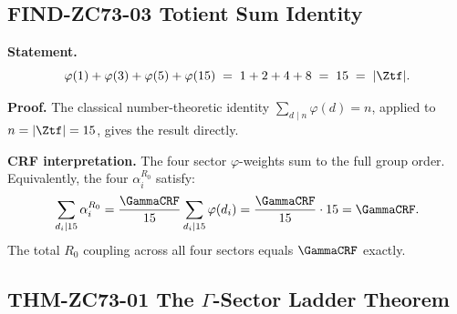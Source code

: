 \documentclass[12pt, a4paper]{article}
\begin{document}
\subsection{FIND-ZC73-03 \quad Totient Sum Identity}
\label{sec:find03}

\begin{derivedbox}[title={FIND-ZC73-03: $\sum_{d_i \mid 15}
  \varphi(d_i) = |\Ztf|$ ($R_0$, Exact)}]
\textbf{Statement.}
\[
  \varphi(1) + \varphi(3) + \varphi(5) + \varphi(15)
  \;=\; 1 + 2 + 4 + 8 \;=\; 15 \;=\; |\Ztf|.
\]

\textbf{Proof.}
The classical number-theoretic identity $\sum_{d \mid n}\varphi(d) = n$,
applied to $n = |\Ztf| = 15$, gives the result directly.

\textbf{CRF interpretation.}
The four sector $\varphi$-weights sum to the full group order.
Equivalently, the four $\alpha_i^{R_0}$ satisfy:
\[
  \sum_{d_i \mid 15} \alpha_i^{R_0}
  = \frac{\GammaCRF}{15}
    \sum_{d_i \mid 15}\varphi(d_i)
  = \frac{\GammaCRF}{15}\cdot 15
  = \GammaCRF.
\]
The total $R_0$ coupling across all four sectors equals $\GammaCRF$ exactly.
\end{derivedbox}

\subsection{THM-ZC73-01 \quad The $\Gamma$-Sector Ladder Theorem}
\label{sec:thm01}

\end{document}
